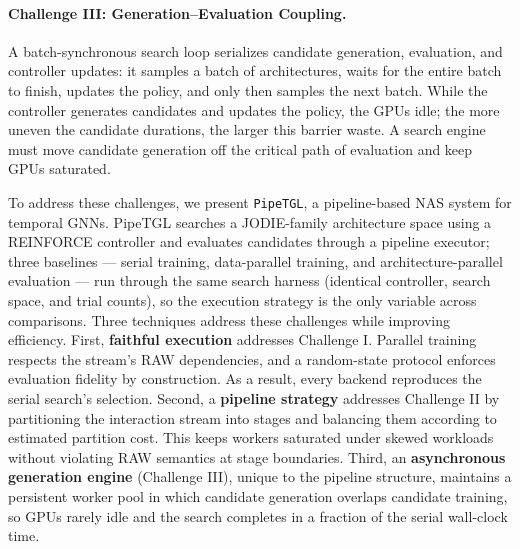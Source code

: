 \documentclass[sigconf, nonacm]{acmart}
\begin{document}
\paragraph{Challenge III: Generation--Evaluation Coupling.}
A batch-synchronous search loop serializes candidate generation,
evaluation, and controller updates: it samples a batch of
architectures, waits for the entire batch to finish, updates the
policy, and only then samples the next batch. While the controller
generates candidates and updates the policy, the GPUs idle; the more
uneven the candidate durations, the larger this barrier waste. A
search engine must move candidate generation off the critical path of
evaluation and keep GPUs saturated.

To address these challenges, we present \texttt{PipeTGL}, a
pipeline-based NAS system for temporal GNNs. PipeTGL searches a
JODIE-family architecture space using a REINFORCE controller and
evaluates candidates through a pipeline executor; three baselines ---
serial training, data-parallel training, and architecture-parallel
evaluation --- run through the same search harness (identical
controller, search space, and trial counts), so the execution strategy
is the only variable across comparisons. Three techniques address
these challenges while improving efficiency. First,
\textbf{faithful execution} addresses Challenge I. Parallel training
respects the stream's RAW dependencies, and a random-state protocol
enforces evaluation fidelity by construction. As a result, every
backend reproduces the serial search's selection. Second, a
\textbf{pipeline strategy} addresses Challenge II by partitioning the
interaction stream into stages and balancing them according to
estimated partition cost. This keeps workers saturated under skewed
workloads without violating RAW semantics at stage boundaries. Third,
an \textbf{asynchronous generation engine} (Challenge III), unique to
the pipeline structure, maintains a persistent worker pool in which
candidate generation overlaps candidate training, so GPUs rarely idle
and the search completes in a fraction of the serial wall-clock
time.
\end{document}
